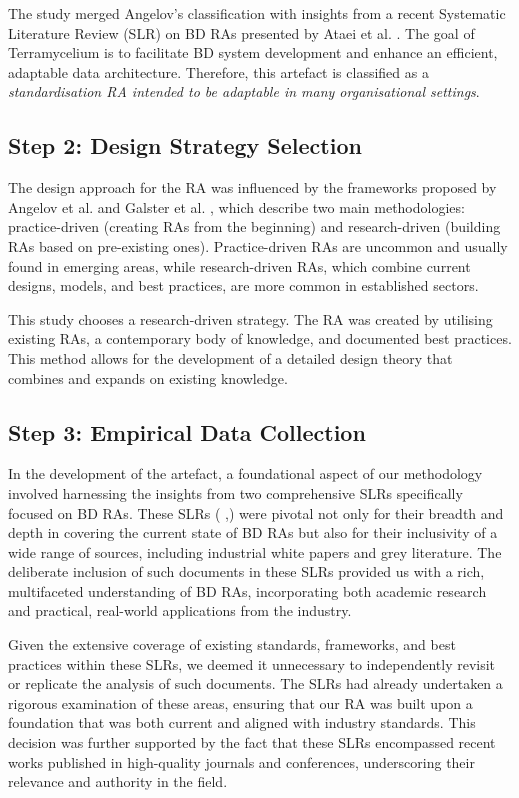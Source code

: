 \documentclass{ieeeaccess}
\begin{document}
The study merged Angelov's classification with insights from a recent Systematic Literature Review (SLR) on BD RAs presented by Ataei et al. \cite{ataei2022state}. The goal of Terramycelium is to facilitate BD system development and enhance an efficient, adaptable data architecture. Therefore, this artefact is classified as a \emph{standardisation RA intended to be adaptable in many organisational settings}.

\subsection{Step 2: Design Strategy Selection}

The design approach for the RA was influenced by the frameworks proposed by Angelov et al. \cite{angelov2012framework} and Galster et al. \cite{GALSTER2011Empirically}, which describe two main methodologies: practice-driven (creating RAs from the beginning) and research-driven (building RAs based on pre-existing ones). Practice-driven RAs are uncommon and usually found in emerging areas, while research-driven RAs, which combine current designs, models, and best practices, are more common in established sectors.

This study chooses a research-driven strategy. The RA was created by utilising existing RAs, a contemporary body of knowledge, and documented best practices. This method allows for the development of a detailed design theory that combines and expands on existing knowledge.

\subsection{Step 3: Empirical Data Collection} \label{theSLR}

In the development of the artefact, a foundational aspect of our methodology involved harnessing the insights from two comprehensive SLRs specifically focused on BD RAs. These SLRs (\cite{ataei2022state} ,\cite{AtaeiACIS}) were pivotal not only for their breadth and depth in covering the current state of BD RAs but also for their inclusivity of a wide range of sources, including industrial white papers and grey literature. The deliberate inclusion of such documents in these SLRs provided us with a rich, multifaceted understanding of BD RAs, incorporating both academic research and practical, real-world applications from the industry.

Given the extensive coverage of existing standards, frameworks, and best practices within these SLRs, we deemed it unnecessary to independently revisit or replicate the analysis of such documents. The SLRs had already undertaken a rigorous examination of these areas, ensuring that our RA was built upon a foundation that was both current and aligned with industry standards. This decision was further supported by the fact that these SLRs encompassed recent works published in high-quality journals and conferences, underscoring their relevance and authority in the field.
\end{document}
